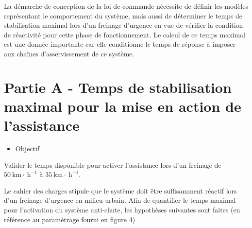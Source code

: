 \documentclass[10pt]{article}
\begin{document}
La démarche de conception de la loi de commande nécessite de définir les modèles représentant le comportement du système, mais aussi de déterminer le temps de stabilisation maximal lors d'un freinage d'urgence en vue de vérifier la condition de réactivité pour cette phase de fonctionnement. Le calcul de ce temps maximal est une donnée importante car elle conditionne le temps de réponse à imposer aux chaînes d'asservissement de ce système.

\section{Partie A - Temps de stabilisation maximal pour la mise en action de l'assistance}
\begin{itemize}
  \item Objectif
\end{itemize}

Valider le temps disponible pour activer l'assistance lors d'un freinage de $50 \mathrm{~km} \cdot \mathrm{~h}^{-1}$ à $35 \mathrm{~km} \cdot \mathrm{~h}^{-1}$.

Le cahier des charges stipule que le système doit être suffisamment réactif lors d'un freinage d'urgence en milieu urbain. Afin de quantifier le temps maximal pour l'activation du système anti-chute, les hypothèses suivantes sont faites (en référence au paramétrage fourni en figure 4)
\end{document}
